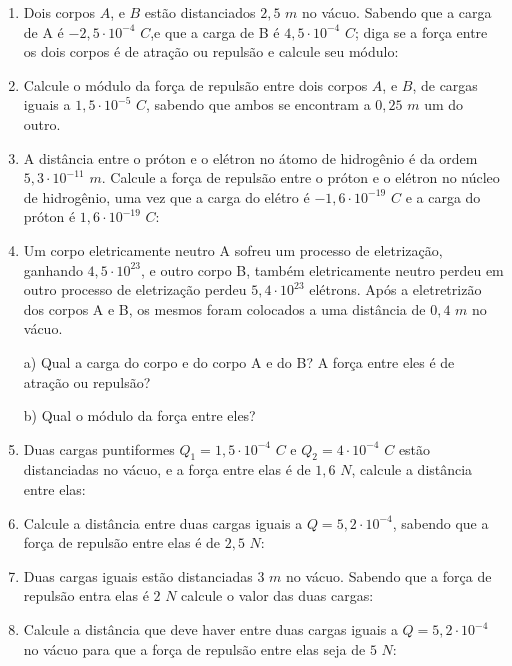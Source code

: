\documentclass[12pt,a4paper]{book}
\begin{document}
	\begin{enumerate}
		
	\item Dois corpos $A$, e $B$ estão distanciados $2,5$ $m$ no vácuo. Sabendo que a carga de A é $-2,5 \cdot 10^{-4}$ $C	$,e que a carga de B é $4,5 \cdot 10^{-4}$ $C$; diga se a força entre os dois corpos é de atração ou repulsão e calcule seu 	módulo:
		
	\item Calcule o módulo da força de repulsão entre dois corpos $A$, e $B$, de cargas iguais a $1,5 \cdot 10^{-5}$ $C$, 	sabendo que ambos se encontram a $0,25$ $m$ um do outro.
		
	\item A distância entre o próton e o elétron no átomo de hidrogênio é da ordem $5,3 \cdot 10^{-11}$ $m$. Calcule a força de repulsão entre o próton e o elétron no núcleo de hidrogênio, uma vez que a carga do elétro é $-1,6 \cdot 10^{-19}$ $C$ e a carga do próton é $1,6 \cdot 10^{-19}$ $C$: 
	
	\item Um corpo eletricamente neutro A sofreu um processo de eletrização, ganhando $4,5 \cdot 10^{23}$, e outro corpo B, também eletricamente neutro perdeu em outro processo de eletrização perdeu $5,4 \cdot 10^{23}$ elétrons. Após a eletretrizão dos corpos A e B, os mesmos foram colocados a uma distância de $0,4$ $m$ no vácuo.
	\par a) Qual a carga do corpo e do corpo A e do B? A força entre eles é de atração ou repulsão?
	\par b) Qual o módulo da força entre eles?
	
	\item Duas cargas puntiformes $Q_{1} = 1,5 \cdot 10^{-4}$ $C$ e $Q_{2} = 4 \cdot 10^{-4}$ $C$ estão distanciadas no vácuo, e a força entre elas é de $1,6$ $N$, calcule a distância entre elas:
	
	\item Calcule a distância entre duas cargas iguais a $Q = 5,2 \cdot 10^{-4}$, sabendo que a força de repulsão entre elas é de $2,5$ $N$:

	\item Duas cargas iguais estão distanciadas $3$ $m$ no vácuo. Sabendo que a força de repulsão entra elas é $2$ $N$ calcule o valor das duas cargas:
	
	\item Calcule a distância que deve haver entre duas cargas iguais a $Q = 5,2 \cdot 10^{-4}$ no vácuo para que a força de repulsão entre elas seja de $5$ $N$: 
	

\end{enumerate}
\end{document}
